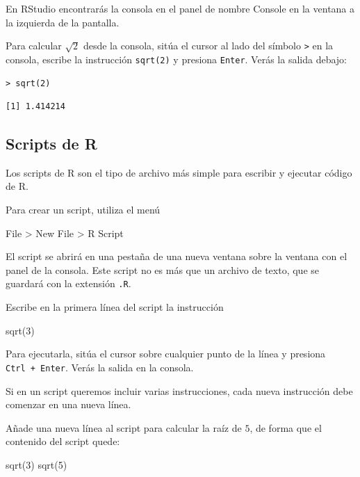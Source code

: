 \documentclass[
  degree=mecinf,
  title=normal,
  toc=normal,
  bib=normal]{mnye}
\newenvironment{Shaded}{\begin{snugshade}}{\end{snugshade}}
\newcommand{\NormalTok}[1]{#1}
\begin{document}
En \textsf{RStudio} encontrarás la consola en el panel de nombre \textsf{Console} en la ventana a la izquierda de la pantalla.

Para calcular \(\sqrt{2}\) desde la consola, sitúa el cursor al lado del símbolo \texttt{\textgreater{}} en la consola, escribe la instrucción \texttt{sqrt(2)} y presiona \texttt{Enter}. Verás la salida debajo:

\begin{verbatim}
> sqrt(2)
\end{verbatim}

\begin{verbatim}
[1] 1.414214
\end{verbatim}

\hypertarget{scripts-de-r}{%
\subsection{Scripts de R}\label{scripts-de-r}}

Los scripts de R son el tipo de archivo más simple para escribir y ejecutar código de \textsf{R}.

Para crear un script, utiliza el menú

\begin{menu}
File \textgreater{} New File \textgreater{} R Script

\end{menu}

El script se abrirá en una pestaña de una nueva ventana sobre la ventana con el panel de la consola. Este script no es más que un archivo de texto, que se guardará con la extensión \texttt{.R}.

Escribe en la primera línea del script la instrucción

\begin{Shaded}
\begin{Highlighting}[]
\NormalTok{sqrt(3)}
\end{Highlighting}
\end{Shaded}

Para ejecutarla, sitúa el cursor sobre cualquier punto de la línea y presiona \texttt{Ctrl\ +\ Enter}. Verás la salida en la consola.

Si en un script queremos incluir varias instrucciones, cada nueva instrucción debe comenzar en una nueva línea.

Añade una nueva línea al script para calcular la raíz de \(5\), de forma que el contenido del script quede:

\begin{Shaded}
\begin{Highlighting}[]
\NormalTok{sqrt(3)}
\NormalTok{sqrt(5)}
\end{Highlighting}
\end{Shaded}
\end{document}
